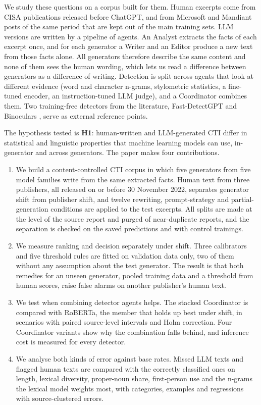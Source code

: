 \documentclass[journal]{IEEEtran}
\begin{document}
We study these questions on a corpus built for them. Human excerpts come from CISA publications released before
ChatGPT, and from Microsoft and Mandiant posts of the same period that are kept out of the main training sets. LLM
versions are written by a pipeline of agents. An Analyst extracts the facts of each excerpt once, and for each
generator a Writer and an Editor produce a new text from those facts alone. All generators therefore describe the
same content and none of them sees the human wording, which lets us read a difference between generators as a
difference of writing. Detection is split across agents that look at different evidence (word and character
n-grams, stylometric statistics, a fine-tuned encoder, an instruction-tuned LLM judge), and a Coordinator combines
them. Two training-free detectors from the literature, Fast-DetectGPT \cite{Bao_2024} and Binoculars
\cite{Hans_2024}, serve as external reference points.

The hypothesis tested is \textbf{H1}: human-written and LLM-generated CTI differ in statistical and linguistic
properties that machine learning models can use, in-generator and across generators. The paper makes four
contributions.
\begin{enumerate}
\item We build a content-controlled CTI corpus in which five generators from five model families write from the
same extracted facts. Human text from three publishers, all released on or before 30 November 2022, separates
generator shift from publisher shift, and twelve rewriting, prompt-strategy and partial-generation conditions are
applied to the test excerpts. All splits are made at the level of the source report and purged of near-duplicate
reports, and the separation is checked on the saved predictions and with control trainings.
\item We measure ranking and decision separately under shift. Three calibrators and five threshold rules are
fitted on validation data only, two of them without any assumption about the test generator. The result is that
both remedies for an unseen generator, pooled training data and a threshold from human scores, raise false alarms
on another publisher's human text.
\item We test when combining detector agents helps. The stacked Coordinator is compared with RoBERTa, the member
that holds up best under shift, in \GapN{} scenarios with paired source-level intervals and Holm correction. Four
Coordinator variants show why the combination falls behind, and inference cost is measured for every detector.
\item We analyse both kinds of error against base rates. Missed LLM texts and flagged human texts are compared with
the correctly classified ones on length, lexical diversity, proper-noun share, first-person use and the n-grams the
lexical model weights most, with categories, examples and regressions with source-clustered errors.
\end{enumerate}
\end{document}
